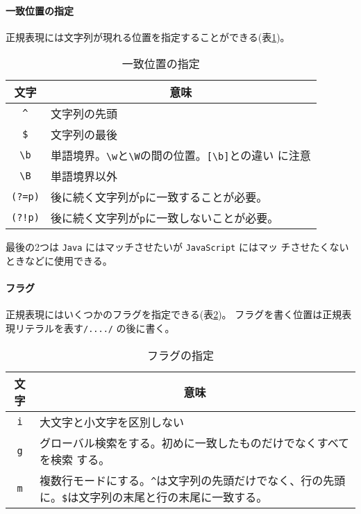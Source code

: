 \paragraph{一致位置の指定}
正規表現には文字列が現れる位置を指定することができる(表\ref{position})。
\begin{table}[ht]
\caption{一致位置の指定}\label{position}
\begin{center}
 \begin{tabular}{|c|l|}\hline
  文字&\multicolumn{1}{c|}{意味}\\\hline
\verb+^+&文字列の先頭\\\hline
\verb+$+&文字列の最後\\\hline
\verb+\b+&単語境界。\verb+\w+と\verb+\W+の間の位置。\verb+[\b]+との違い
      に注意\\\hline
\verb+\B+&単語境界以外\\\hline
\verb+(?=p)+&後に続く文字列が\verb+p+に一致することが必要。\\\hline
\verb+(?!p)+&後に続く文字列が\verb+p+に一致しないことが必要。\\\hline
\end{tabular}
\end{center}
\end{table}

最後の2つは \verb+Java+ にはマッチさせたいが \verb+JavaScript+ にはマッ
チさせたくないときなどに使用できる。
\paragraph{フラグ}
正規表現にはいくつかのフラグを指定できる(表\ref{flag})。
フラグを書く位置は正規表現リテラルを表す\verb+/..../+ の後に書く。
\begin{table}[ht]
\caption{フラグの指定}\label{flag}
\begin{center}
 \begin{tabular}{|c|m{}|}\hline
  文字&\multicolumn{1}{c|}{意味}\\\hline
\verb+i+&大文字と小文字を区別しない\\\hline
\verb+g+&グローバル検索をする。初めに一致したものだけでなくすべてを検索
      する。\\\hline
\verb+m+&複数行モードにする。\verb+^+は文字列の先頭だけでなく、行の先頭
      に。\verb+$+は文字列の末尾と行の末尾に一致する。\\\hline
\end{tabular}
\end{center}
\end{table}

